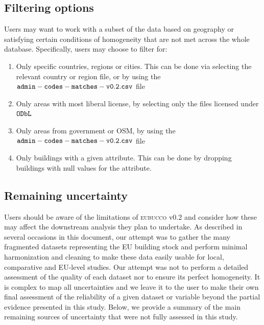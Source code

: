 \documentclass[fleqn,10pt]{wlscirep}
\begin{document}
\subsection*{Filtering options}
Users may want to work with a subset of the data based on geography or satisfying certain conditions of homogeneity that are not met across the whole database. Specifically, users may choose to filter for:
\begin{enumerate}[topsep=0.2pt]
    \itemsep-0.15em 
    \item Only specific countries, regions or cities. This can be done via selecting the relevant country or region file, or by using the ${\tt admin-codes-matches-v0.2.csv}$ file
    \item Only areas with most liberal license, by selecting only the files licensed under ${\tt ODbL}$   
    \item Only areas from government or OSM, by using the ${\tt admin-codes-matches-v0.2.csv}$ file
    \item Only buildings with a given attribute. This can be done by dropping buildings with null values for the attribute.
\end{enumerate}


\subsection*{Remaining uncertainty}
Users should be aware of the limitations of \textsc{eubucco} v0.2 and consider how these may affect the downstream analysis they plan to undertake. As described in several occasions in this document, our attempt was to gather the many fragmented datasets representing the EU building stock and perform minimal harmonization and cleaning to make these data easily usable for local, comparative and EU-level studies. Our attempt was not to perform a detailed assessment of the quality of each dataset nor to ensure its perfect homogeneity.
It is complex to map all uncertainties and we leave it to the user to make their own final assessment of the reliability of a given dataset or variable beyond the partial evidence presented in this study.
Below, we provide a summary of the main remaining sources of uncertainty that were not fully assessed in this study.  
\end{document}
